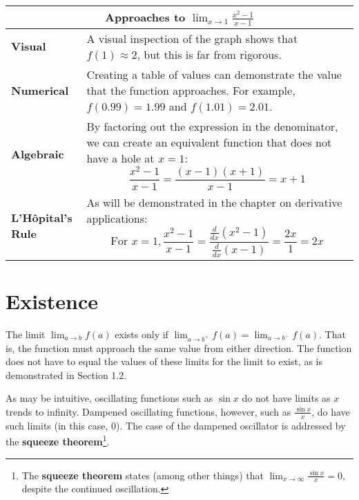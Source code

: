 \documentclass[10pt,a4paper]{book}
\begin{document}
\begin{tabularx}{\textwidth}{ l|X }
	\multicolumn{2}{c}{\textbf{Approaches to $\displaystyle \lim_{x \to 1} {\frac{x^2-1}{x-1}}$}} \\
	\hline
	\textbf{Visual} & A visual inspection of the graph shows that $f(1)\approx 2$, but this is far from rigorous. \\
	\textbf{Numerical} & Creating a table of values can demonstrate the value that the function approaches. For example, $f(0.99)=1.99$ and $f(1.01)=2.01$.\\
	\textbf{Algebraic} & By factoring out the expression in the denominator, we can create an equivalent function that does not have a hole at $x=1$:
	\[
	{\frac{x^2-1}{x-1}} = {\frac{(x-1)(x+1)}{x-1}} = x+1
	\]
	\\
	\textbf{L'H\^{o}pital's Rule} & As will be demonstrated in the chapter on derivative applications:
	\[
	\text{For }x=1, {\frac{x^2-1}{x-1}} = {\frac{\frac{d}{dx}\left(x^2-1\right)}{\frac{d}{dx}\left(x-1\right)}} = \frac{2x}{1} = 2x
	\]
	\\
\end{tabularx}

\section{Existence}
The limit $\displaystyle \lim_{a \to b} f(a)$ exists only if $\displaystyle \lim_{a \to b^{+}} f(a) = \lim_{a \to b^{-}} f(a)$. That is, the function must approach the same value from either direction. The function does not have to equal the values of these limits for the limit to exist, as is demonstrated in Section 1.2.

As may be intuitive, oscillating functions such as $\sin x$ do not have limits as $x$ trends to infinity. Dampened oscillating functions, however, such as $\frac{\sin x}{x}$, do have such limits (in this case, 0). The case of the dampened oscillator is addressed by the \textbf{squeeze theorem}\footnote{The \textbf{squeeze theorem} states (among other things) that $\displaystyle \lim_{x \to \infty} {\frac{\sin x}{x}} = 0$, despite the continued oscillation.}.
\end{document}
